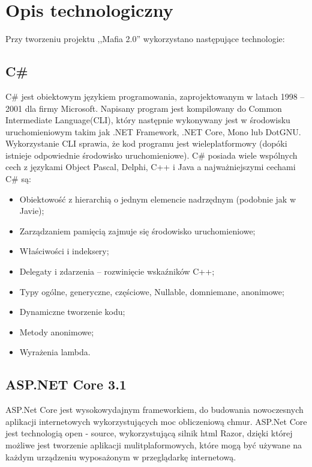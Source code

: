 \documentclass[12pt,a4paper]{article}
\begin{document}
	\newpage

	\section{Opis technologiczny}
		\indent Przy tworzeniu projektu ,,Mafia 2.0'' wykorzystano następujące technologie:

		\subsection{C\#}
			\indent C\# jest obiektowym językiem programowania, zaprojektowanym w latach 1998 – 2001 dla firmy Microsoft.
			Napisany program jest kompilowany do Common Intermediate Language(CLI), który następnie wykonywany jest w środowisku uruchomieniowym takim jak .NET Framework,
			.NET Core, Mono lub DotGNU.
			Wykorzystanie CLI sprawia, że kod programu jest wieleplatformowy (dopóki istnieje odpowiednie środowisko uruchomieniowe).
			C\# posiada wiele wspólnych cech z językami Object Pascal, Delphi, C++ i Java a najważniejszymi cechami C\# są:
			\begin{itemize}
				\item Obiektowość z hierarchią o jednym elemencie nadrzędnym (podobnie jak w Javie);
				\item Zarządzaniem pamięcią zajmuje się środowisko uruchomieniowe;
				\item Właściwości i indeksery;
				\item Delegaty i zdarzenia – rozwinięcie wskaźników C++;
				\item Typy ogólne, generyczne, częściowe, Nullable, domniemane, anonimowe;
				\item Dynamiczne tworzenie kodu;
				\item Metody anonimowe;
				\item Wyrażenia lambda.
			\end{itemize}
			
		\subsection{ASP.NET Core 3.1}
			\indent ASP.Net Core jest wysokowydajnym frameworkiem, do budowania nowoczesnych aplikacji internetowych wykorzystujących moc obliczeniową chmur. ASP.Net Core jest technologią
			open - source, wykorzystującą silnik html Razor, dzięki której możliwe jest tworzenie aplikacji mulitplaformowych, które mogą być używane na każdym urządzeniu wyposażonym
			w przeglądarkę internetową.
			
\end{document}
